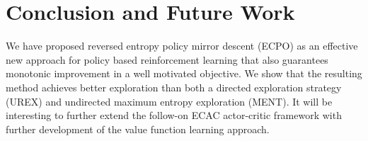 
\section{Conclusion and Future Work}
\label{sec:conclusion_and_future_work}

We have proposed reversed entropy policy mirror descent (ECPO)
as an effective new approach for policy based reinforcement learning
that also guarantees monotonic improvement in a well motivated objective.
We show that the resulting method achieves better exploration than both
a directed exploration strategy (UREX) and undirected maximum entropy
exploration (MENT). 
It will be interesting to further extend the follow-on
ECAC actor-critic framework
with further development of the value function learning approach.

